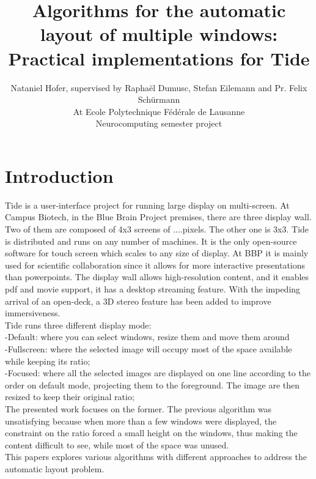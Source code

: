 \documentclass{acmtog}
\begin{document}
\makeatletter
\def\runningfoot{\def\@runningfoot{}}
\def\firstfoot{\def\@firstfoot{}}
\makeatother



\title{Algorithms for the automatic layout of multiple windows: \\Practical implementations for Tide}

\author{Nataniel Hofer, supervised by Raphaël Dumusc, Stefan Eilemann and Pr. Felix Schürmann \\
At Ecole Polytechnique Fédérale de Lausanne\\
Neurocomputing semester project}

\maketitle

\section{Introduction}
Tide is a user-interface project for running large display on multi-screen. At Campus Biotech, in the Blue Brain Project premises, there are three display wall. Two of them are composed of 4x3 screens of ....pixels. The other one is 3x3. Tide is distributed and runs on any number of machines. It is the only open-source software for touch screen which scales to any size of display. At BBP it is mainly used for scientific collaboration since it allows for more interactive presentations  than powerpoints. The display wall allows  high-resolution content, and it enables pdf and movie support, it has a desktop streaming feature. With the impeding arrival of an open-deck, 
a 3D stereo feature has been added to improve immersiveness. \\
Tide runs three different display mode:\\
-Default: where you can select windows, resize them and move them around \\
-Fullscreen: where the selected image will occupy most of the space available while keeping its ratio; \\
-Focused: where  all the selected images are displayed on one line according to the order on default mode, projecting them to the foreground. The image are then resized to keep their original ratio;\\
The presented work focuses on the former. 
The previous algorithm was unsatisfying because when more than a few windows were displayed, the constraint on the ratio forced a small height on the windows, thus making the content difficult to see, while most of the space was unused. \\
This papers explores various algorithms with different approaches to address the automatic layout problem.\\
\end{document}
